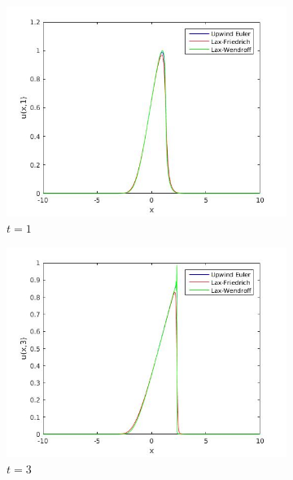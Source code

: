 \begin{figure}[H]
\centering
\begin{subfigure}[b]{0.45\textwidth}
  \includegraphics[width=\textwidth]{Images/8_ull_1.jpg}
  \caption{$t=1$}
\end{subfigure}
\begin{subfigure}[b]{0.45\textwidth}
  \includegraphics[width=\textwidth]{Images/8_ull_2.jpg}
  \caption{$t=3$}
\end{subfigure}
\begin{subfigure}[b]{0.45\textwidth}

\end{subfigure}
\end{figure}
